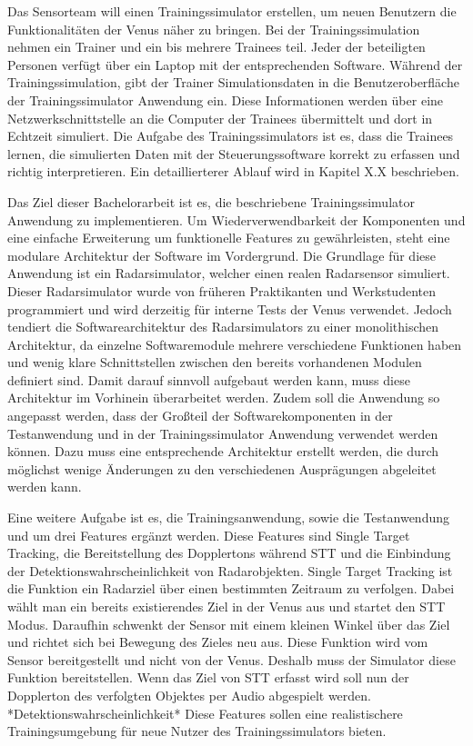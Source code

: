 Das Sensorteam will einen Trainingssimulator erstellen, um neuen Benutzern die Funktionalitäten der Venus näher zu bringen. Bei der Trainingssimulation nehmen ein Trainer und ein bis mehrere Trainees teil. Jeder der beteiligten Personen verfügt über ein Laptop mit der entsprechenden Software. Während der Trainingssimulation, gibt der Trainer Simulationsdaten in die Benutzeroberfläche der Trainingssimulator Anwendung ein. Diese Informationen werden über eine Netzwerkschnittstelle an die Computer der Trainees übermittelt und dort in Echtzeit simuliert. Die Aufgabe des Trainingssimulators ist es, dass die Trainees lernen, die simulierten Daten mit der Steuerungssoftware korrekt zu erfassen und richtig interpretieren. Ein detaillierterer Ablauf wird in Kapitel X.X beschrieben.

Das Ziel dieser Bachelorarbeit ist es, die beschriebene Trainingssimulator Anwendung zu implementieren. Um Wiederverwendbarkeit der Komponenten und eine einfache Erweiterung um funktionelle Features zu gewährleisten, steht eine modulare Architektur der Software im Vordergrund. Die Grundlage für diese Anwendung ist ein Radarsimulator, welcher einen realen Radarsensor simuliert. Dieser Radarsimulator wurde von früheren Praktikanten und Werkstudenten programmiert und wird derzeitig für interne Tests der Venus verwendet. Jedoch tendiert die Softwarearchitektur des Radarsimulators zu einer monolithischen Architektur, da einzelne Softwaremodule mehrere verschiedene Funktionen haben und wenig klare Schnittstellen zwischen den bereits vorhandenen Modulen definiert sind. Damit darauf sinnvoll aufgebaut werden kann, muss diese Architektur im Vorhinein überarbeitet werden. Zudem soll die Anwendung so angepasst werden, dass der Großteil der Softwarekomponenten in der Testanwendung und in der Trainingssimulator Anwendung verwendet werden können. Dazu muss eine entsprechende Architektur erstellt werden, die durch möglichst wenige Änderungen zu den verschiedenen Ausprägungen abgeleitet werden kann.

Eine weitere Aufgabe ist es, die Trainingsanwendung, sowie die Testanwendung und um drei Features ergänzt werden. Diese Features sind Single Target Tracking, die Bereitstellung des Dopplertons während STT und die Einbindung der Detektionswahrscheinlichkeit von Radarobjekten. Single Target Tracking ist die Funktion ein Radarziel über einen bestimmten Zeitraum zu verfolgen. Dabei wählt man ein bereits existierendes Ziel in der Venus aus und startet den STT Modus. Daraufhin schwenkt der Sensor mit einem kleinen Winkel über das Ziel und richtet sich bei Bewegung des Zieles neu aus. Diese Funktion wird vom Sensor bereitgestellt und nicht von der Venus. Deshalb muss der Simulator diese Funktion bereitstellen. Wenn das Ziel von STT erfasst wird soll nun der Dopplerton des verfolgten Objektes per Audio abgespielt werden. *Detektionswahrscheinlichkeit* Diese Features sollen eine realistischere Trainingsumgebung für neue Nutzer des Trainingssimulators bieten.


